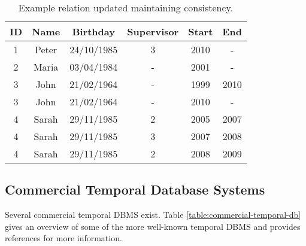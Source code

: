 



\begin{table}
\centering
\caption{Example relation updated maintaining consistency.}
\begin{tabular}{c c c c c c }
\hline
\textbf{ID} & \textbf{Name} & \textbf{Birthday} & \textbf{Supervisor} & \textbf{Start} & \textbf{End} \\ \hline
1 & Peter & 24/10/1985 & 3 &  2010 & - \\
2 & Maria & 03/04/1984 & - & 2001 & - \\
3 & John & 21/02/1964 & - &  1999 & 2010 \\
3 & John & 21/02/1964 & - &  2010 & - \\
4 & Sarah & 29/11/1985 & 2 &  2005 & 2007 \\
4 & Sarah & 29/11/1985 & 3 &  2007 & 2008 \\
4 & Sarah & 29/11/1985 & 2 &  2008 & 2009 \\
\hline 
\end{tabular}
\label{table:example-database-update}



\end{table}





\subsection{\label{Comm-temp}Commercial Temporal Database Systems}
Several commercial temporal DBMS exist. Table \ref{table:commercial-temporal-db} gives an overview of some of the more well-known temporal DBMS and provides references for more information. 

